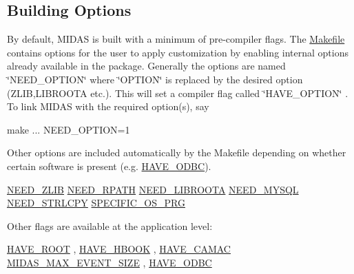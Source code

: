  \hypertarget{BuildingOptions_BO_building_option}{}\subsection{Building Options}\label{BuildingOptions_BO_building_option}
By default, MIDAS is built with a minimum of pre-\/compiler flags. The \hyperlink{Makefile}{Makefile} contains options for the user to apply customization by enabling internal options already available in the package. Generally the options are named \char`\"{}NEED\_\-OPTION\char`\"{} where \char`\"{}OPTION\char`\"{} is replaced by the desired option (ZLIB,LIBROOTA etc.). This will set a compiler flag called \char`\"{}HAVE\_\-OPTION\char`\"{} . To link MIDAS with the required option(s), say 
\begin{DoxyCode}
make ... NEED_OPTION=1
\end{DoxyCode}



\begin{DoxyItemize}
\item Other options are included automatically by the Makefile depending on whether certain software is present (e.g. \hyperlink{BuildingOptions_BO_HAVE_ODBC}{HAVE\_\-ODBC}).
\begin{DoxyItemize}
\item \hyperlink{BuildingOptions_BO_NEED_ZLIB}{NEED\_\-ZLIB} \hyperlink{BuildingOptions_BO_NEED_RPATH}{NEED\_\-RPATH} \hyperlink{BuildingOptions_BO_NEED_LIBROOTA}{NEED\_\-LIBROOTA} \hyperlink{BuildingOptions_BO_NEED_MYSQL}{NEED\_\-MYSQL} \hyperlink{BuildingOptions_BO_NEED_STRLCPY}{NEED\_\-STRLCPY} \hyperlink{BuildingOptions_BO_SPECIFIC_OS_PRG}{SPECIFIC\_\-OS\_\-PRG}
\end{DoxyItemize}
\end{DoxyItemize}


\begin{DoxyItemize}
\item Other flags are available at the application level:
\begin{DoxyItemize}
\item \hyperlink{BuildingOptions_BO_HAVE_ROOT}{HAVE\_\-ROOT} , \hyperlink{BuildingOptions_BO_HAVE_HBOOK}{HAVE\_\-HBOOK} , \hyperlink{BuildingOptions_BO_HAVE_CAMAC}{HAVE\_\-CAMAC} \hyperlink{BuildingOptions_BO_MIDAS_MAX_EVENT_SIZE}{MIDAS\_\-MAX\_\-EVENT\_\-SIZE} , \hyperlink{BuildingOptions_BO_HAVE_ODBC}{HAVE\_\-ODBC}
\end{DoxyItemize}
\end{DoxyItemize}


